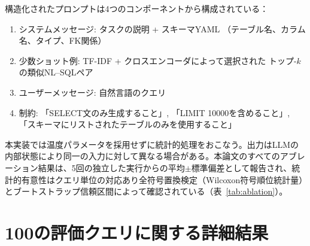 \documentclass[twocolumn]{interact}
\begin{document}
構造化されたプロンプトは4つのコンポーネントから構成されている：

\begin{enumerate}
  \item システムメッセージ: タスクの説明 + スキーマYAML
    （テーブル名、カラム名、タイプ、FK関係）
  \item 少数ショット例: TF-IDF + クロスエンコーダによって選択された
    トップ-$k$の類似NL--SQLペア
  \item ユーザーメッセージ: 自然言語のクエリ
  \item 制約: 「SELECT文のみ生成すること」,
    「LIMIT 10000を含めること」,
    「スキーマにリストされたテーブルのみを使用すること」
\end{enumerate}

本実装では温度パラメータを採用せずに統計的処理をおこなう。出力はLLMの内部状態により同一の入力に対して異なる場合がある。本論文のすべてのアブレーション結果は、5回の独立した実行からの平均$\pm$標準偏差として報告され、統計的有意性はクエリ単位の対応あり全符号置換検定（Wilcoxon符号順位統計量）とブートストラップ信頼区間によって確認されている（表~\ref{tab:ablation}）。


\section{100の評価クエリに関する詳細結果}
\label{sec:sup_query_detail}
\end{document}
